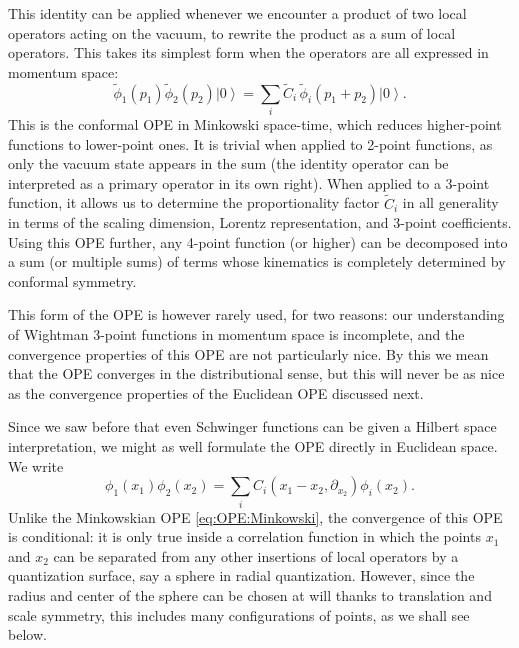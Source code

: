\documentclass[a4paper,12pt]{article}
\newcommand{\ket}[1]{\left| #1 \right\rangle}
\numberwithin{equation}{section}
\begin{document}
This identity can be applied whenever we encounter a product of two local operators acting on the vacuum, to rewrite the product as a sum of local operators. This takes its simplest form when the operators are all expressed in momentum space:
\begin{equation}
	\widetilde{\phi}_1(p_1) \widetilde{\phi}_2(p_2) \ket{0}
	= \sum_i \widetilde{C}_i \, \widetilde{\phi}_i(p_1 + p_2) \ket{0}.
	\label{eq:OPE:Minkowski}
\end{equation}
This is the conformal OPE in Minkowski space-time, which reduces higher-point functions to lower-point ones. It is trivial when applied to 2-point functions, as only the vacuum state appears in the sum (the identity operator can be interpreted as a primary operator in its own right). When applied to a 3-point function, it allows us to determine the proportionality factor $\widetilde{C}_i$ in all generality in terms of the scaling dimension, Lorentz representation, and 3-point coefficients. Using this OPE further, any 4-point function (or higher) can be decomposed into a sum (or multiple sums) of terms whose kinematics is completely determined by conformal symmetry.

This form of the OPE is however rarely used, for two reasons: our understanding of Wightman 3-point functions in momentum space is incomplete, and the convergence properties of this OPE are not particularly nice. By this we mean that the OPE converges in the distributional sense, but this will never be as nice as the convergence properties of the Euclidean OPE discussed next.

Since we saw before that even Schwinger functions can be given a Hilbert space interpretation, we might as well formulate the OPE directly in Euclidean space. We write
\begin{equation}
	\phi_1(x_1) \phi_2(x_2) = \sum_i
	C_i\left( x_1 - x_2, \partial_{x_2} \right) \phi_i(x_2).
	\label{eq:OPE:Euclidean}
\end{equation}
Unlike the Minkowskian OPE \eqref{eq:OPE:Minkowski}, the convergence of this OPE is conditional: it is only true inside a correlation function in which the points $x_1$ and $x_2$ can be separated from any other insertions of local operators by a quantization surface, say a sphere in radial quantization. However, since the radius and center of the sphere can be chosen at will thanks to translation and scale symmetry, this includes many configurations of points, as we shall see below.
\end{document}
